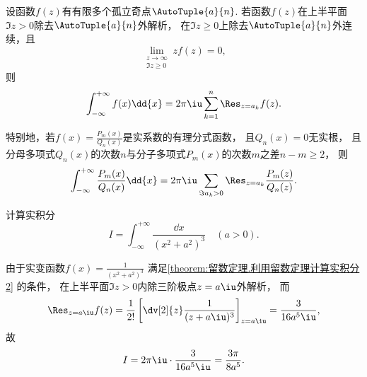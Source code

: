 \begin{theorem}\label{theorem:留数定理.利用留数定理计算实积分2}
设函数\(f(z)\)有有限多个孤立奇点\(\AutoTuple{a}{n}\).
若函数\(f(z)\)在上半平面\(\Im z > 0\)除去\(\AutoTuple{a}{n}\)外解析，
在\(\Im z \geq 0\)上除去\(\AutoTuple{a}{n}\)外连续，且\begin{equation*}
	\lim_{\substack{z\to\infty \\ \Im z \geq 0}} z f(z) = 0,
\end{equation*}
则\begin{equation}
	\int_{-\infty}^{+\infty} f(x) \dd{x}
	= 2\pi\iu \sum_{k=1}^n \Res_{z=a_k} f(z).
\end{equation}

特别地，若\(f(x) = \frac{P_m(x)}{Q_n(x)}\)是实系数的有理分式函数，
且\(Q_n(x) = 0\)无实根，
且分母多项式\(Q_n(x)\)的次数\(n\)与分子多项式\(P_m(x)\)的次数\(m\)之差\(n-m\geq2\)，
则\begin{equation}
	\int_{-\infty}^{+\infty} \frac{P_m(x)}{Q_n(x)} \dd{x}
	= 2\pi\iu \sum_{\Im a_k > 0} \Res_{z=a_k} \frac{P_m(z)}{Q_n(z)}.
\end{equation}
\end{theorem}

\begin{example}
计算实积分\begin{equation*}
	I = \int_{-\infty}^{+\infty} \frac{\dd{x}}{(x^2+a^2)^3} \quad(a>0).
\end{equation*}
\begin{solution}
由于实变函数\(f(x) = \frac{1}{(x^2+a^2)^3}\)
满足\cref{theorem:留数定理.利用留数定理计算实积分2} 的条件，
在上半平面\(\Im z > 0\)内除三阶极点\(z=a\iu\)外解析，
而\begin{equation*}
	\Res_{z=a\iu} f(z)
	= \frac{1}{2!} \left[ \dv[2]{z} \frac{1}{(z+a\iu)^3} \right]_{z=a\iu}
	= \frac{3}{16a^5\iu},
\end{equation*}
故\begin{equation*}
	I = 2\pi\iu \cdot \frac{3}{16a^5\iu} = \frac{3\pi}{8a^5}.
\end{equation*}
\end{solution}
\end{example}

